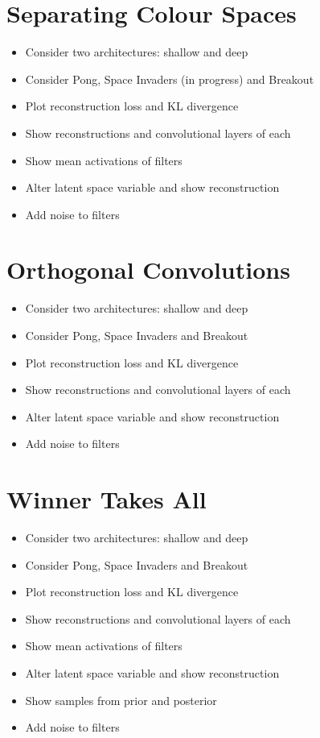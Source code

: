 %
%
%
%
%
\section{Separating Colour Spaces}
\begin{itemize}
\item Consider two architectures: shallow and deep
\item Consider Pong, Space Invaders (in progress) and Breakout
\item Plot reconstruction loss and KL divergence
\item Show reconstructions and convolutional layers of each
\item Show mean activations of filters
\item Alter latent space variable and show reconstruction
\item Add noise to filters
\end{itemize}







%
%
%
%
%
\section{Orthogonal Convolutions}
\begin{itemize}
\item Consider two architectures: shallow and deep
\item Consider Pong, Space Invaders and Breakout
\item Plot reconstruction loss and KL divergence
\item Show reconstructions and convolutional layers of each
\item Alter latent space variable and show reconstruction
\item Add noise to filters
\end{itemize}



%
%
%
%
%
\section{Winner Takes All}
\begin{itemize}
\item Consider two architectures: shallow and deep
\item Consider Pong, Space Invaders and Breakout
\item Plot reconstruction loss and KL divergence
\item Show reconstructions and convolutional layers of each
\item Show mean activations of filters
\item Alter latent space variable and show reconstruction
\item Show samples from prior and posterior
\item Add noise to filters
\end{itemize}


